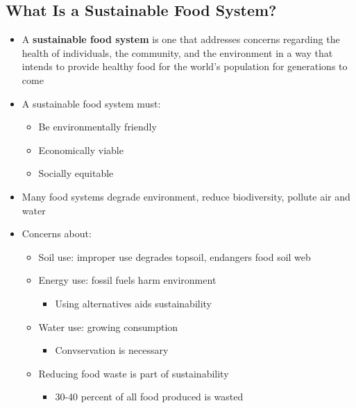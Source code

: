 \documentclass[12pt]{article}
\begin{document}
        \subsection{What Is a Sustainable Food System?}
            \begin{itemize}
                \item A \textbf{sustainable food system} is one that addresses concerns regarding the health of individuals, the community, and the environment in a way that intends to provide healthy food for the world's population for generations to come
                \item A sustainable food system must:
                    \begin{itemize}
                        \item Be environmentally friendly
                        \item Economically viable
                        \item Socially equitable
                    \end{itemize}
                \item Many food systems degrade environment, reduce biodiversity, pollute air and water
                \item Concerns about:
                    \begin{itemize}
                        \item Soil use: improper use degrades topsoil, endangers food soil web
                        \item Energy use: fossil fuels harm environment
                            \begin{itemize}
                                \item Using alternatives aids sustainability
                            \end{itemize}
                        \item Water use: growing consumption
                            \begin{itemize}
                                \item Convservation is necessary
                            \end{itemize}
                        \item Reducing food waste is part of sustainability
                            \begin{itemize}
                                \item 30-40 percent of all food produced is wasted

\end{itemize}
\end{itemize}
\end{itemize}
\end{document}
